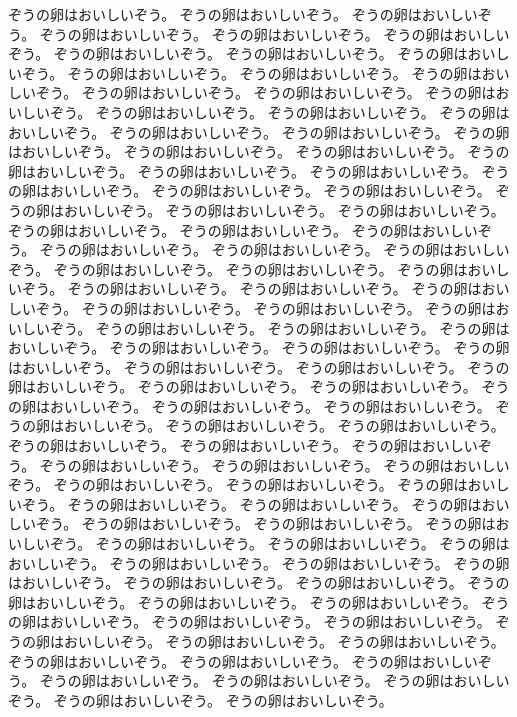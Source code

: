 ぞうの卵はおいしいぞう。
ぞうの卵はおいしいぞう。
ぞうの卵はおいしいぞう。
ぞうの卵はおいしいぞう。
ぞうの卵はおいしいぞう。
ぞうの卵はおいしいぞう。
ぞうの卵はおいしいぞう。
ぞうの卵はおいしいぞう。
ぞうの卵はおいしいぞう。
ぞうの卵はおいしいぞう。
ぞうの卵はおいしいぞう。
ぞうの卵はおいしいぞう。
ぞうの卵はおいしいぞう。
ぞうの卵はおいしいぞう。
ぞうの卵はおいしいぞう。
ぞうの卵はおいしいぞう。
ぞうの卵はおいしいぞう。
ぞうの卵はおいしいぞう。
ぞうの卵はおいしいぞう。
ぞうの卵はおいしいぞう。
ぞうの卵はおいしいぞう。
ぞうの卵はおいしいぞう。
ぞうの卵はおいしいぞう。
ぞうの卵はおいしいぞう。
ぞうの卵はおいしいぞう。
ぞうの卵はおいしいぞう。
ぞうの卵はおいしいぞう。
ぞうの卵はおいしいぞう。
ぞうの卵はおいしいぞう。
ぞうの卵はおいしいぞう。
ぞうの卵はおいしいぞう。
ぞうの卵はおいしいぞう。
ぞうの卵はおいしいぞう。
ぞうの卵はおいしいぞう。
ぞうの卵はおいしいぞう。
ぞうの卵はおいしいぞう。
ぞうの卵はおいしいぞう。
ぞうの卵はおいしいぞう。
ぞうの卵はおいしいぞう。
ぞうの卵はおいしいぞう。
ぞうの卵はおいしいぞう。
ぞうの卵はおいしいぞう。
ぞうの卵はおいしいぞう。
ぞうの卵はおいしいぞう。
ぞうの卵はおいしいぞう。
ぞうの卵はおいしいぞう。
ぞうの卵はおいしいぞう。
ぞうの卵はおいしいぞう。
ぞうの卵はおいしいぞう。
ぞうの卵はおいしいぞう。
ぞうの卵はおいしいぞう。
ぞうの卵はおいしいぞう。
ぞうの卵はおいしいぞう。
ぞうの卵はおいしいぞう。
ぞうの卵はおいしいぞう。
ぞうの卵はおいしいぞう。
ぞうの卵はおいしいぞう。
ぞうの卵はおいしいぞう。
ぞうの卵はおいしいぞう。
ぞうの卵はおいしいぞう。
ぞうの卵はおいしいぞう。
ぞうの卵はおいしいぞう。
ぞうの卵はおいしいぞう。
ぞうの卵はおいしいぞう。
ぞうの卵はおいしいぞう。
ぞうの卵はおいしいぞう。
ぞうの卵はおいしいぞう。
ぞうの卵はおいしいぞう。
ぞうの卵はおいしいぞう。
ぞうの卵はおいしいぞう。
ぞうの卵はおいしいぞう。
ぞうの卵はおいしいぞう。
ぞうの卵はおいしいぞう。
ぞうの卵はおいしいぞう。
ぞうの卵はおいしいぞう。
ぞうの卵はおいしいぞう。
ぞうの卵はおいしいぞう。
ぞうの卵はおいしいぞう。
ぞうの卵はおいしいぞう。
ぞうの卵はおいしいぞう。
ぞうの卵はおいしいぞう。
ぞうの卵はおいしいぞう。
ぞうの卵はおいしいぞう。
ぞうの卵はおいしいぞう。
ぞうの卵はおいしいぞう。
ぞうの卵はおいしいぞう。
ぞうの卵はおいしいぞう。
ぞうの卵はおいしいぞう。
ぞうの卵はおいしいぞう。
ぞうの卵はおいしいぞう。
ぞうの卵はおいしいぞう。
ぞうの卵はおいしいぞう。
ぞうの卵はおいしいぞう。
ぞうの卵はおいしいぞう。
ぞうの卵はおいしいぞう。
ぞうの卵はおいしいぞう。
ぞうの卵はおいしいぞう。
ぞうの卵はおいしいぞう。
ぞうの卵はおいしいぞう。
ぞうの卵はおいしいぞう。
ぞうの卵はおいしいぞう。
ぞうの卵はおいしいぞう。
ぞうの卵はおいしいぞう。
ぞうの卵はおいしいぞう。

